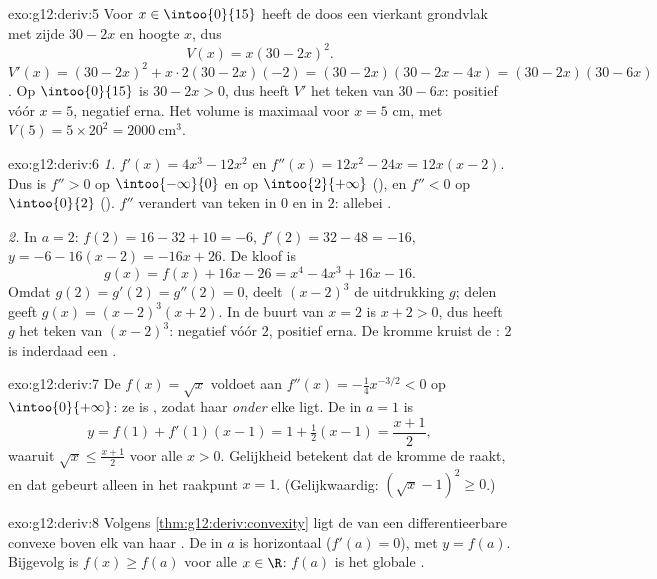 \begin{solution}{exo:g12:deriv:5}
Voor $x \in \intoo{0}{15}$ heeft de doos een vierkant grondvlak met zijde
$30 - 2x$ en hoogte $x$, dus
\[
V(x) = x(30 - 2x)^2 .
\]
$V'(x) = (30-2x)^2 + x \cdot 2(30-2x)(-2) = (30-2x)(30 - 2x - 4x)
= (30-2x)(30-6x)$. Op $\intoo{0}{15}$ is $30 - 2x > 0$, dus heeft $V'$ het
teken van $30 - 6x$: positief vóór $x = 5$, negatief erna. Het volume is
maximaal voor $x = 5$ cm, met $V(5) = 5 \times 20^2 = 2000\ \text{cm}^3$.
\end{solution}

\begin{solution}{exo:g12:deriv:6}
\emph{1.} $f'(x) = 4x^3 - 12x^2$ en $f''(x) = 12x^2 - 24x = 12x(x-2)$. Dus is
$f'' > 0$ op $\intoo{-\infty}{0}$ en op $\intoo{2}{+\infty}$ (), en
$f'' < 0$ op $\intoo{0}{2}$ (). $f''$ verandert van teken in $0$ en in
$2$: allebei .

\emph{2.} In $a = 2$: $f(2) = 16 - 32 + 10 = -6$, $f'(2) = 32 - 48 = -16$,
 $y = -6 - 16(x-2) = -16x + 26$. De kloof is
\[
g(x) = f(x) + 16x - 26 = x^4 - 4x^3 + 16x - 16 .
\]
Omdat $g(2) = g'(2) = g''(2) = 0$, deelt $(x-2)^3$ de uitdrukking $g$; delen
geeft $g(x) = (x-2)^3(x+2)$. In de buurt van $x = 2$ is $x + 2 > 0$, dus
heeft $g$ het teken van $(x-2)^3$: negatief vóór $2$, positief erna. De
kromme kruist de : $2$ is inderdaad een .
\end{solution}

\begin{solution}{exo:g12:deriv:7}
De  $f(x) = \sqrt{x}$ voldoet aan $f''(x) = -\frac{1}{4}x^{-3/2} < 0$
op $\intoo{0}{+\infty}$: ze is , zodat haar  \emph{onder} elke
 ligt. De  in $a = 1$ is
\[
y = f(1) + f'(1)(x - 1) = 1 + \tfrac12 (x-1) = \frac{x+1}{2},
\]
waaruit $\sqrt{x} \leq \frac{x+1}{2}$ voor alle $x > 0$. Gelijkheid betekent
dat de kromme de  raakt, en dat gebeurt alleen in het raakpunt
$x = 1$. (Gelijkwaardig: $\left(\sqrt x - 1\right)^2 \geq 0$.)
\end{solution}

\begin{solution}{exo:g12:deriv:8}
Volgens \cref{thm:g12:deriv:convexity} ligt de  van een
differentieerbare convexe  boven elk van haar . De 
in $a$ is horizontaal ($f'(a) = 0$), met  $y = f(a)$. Bijgevolg is
$f(x) \geq f(a)$ voor alle $x \in \R$: $f(a)$ is het globale .
\end{solution}

